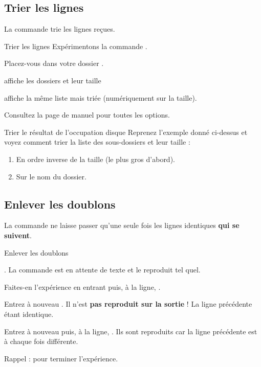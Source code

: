 \documentclass[a4paper,11pt]{style-esi/td}
\begin{document}
	\subsection{Trier les lignes}

		La commande  trie les lignes reçues.

		\begin{Experience}{Trier les lignes}
			Expérimentons la commande .
			\begin{steps}
			\item 
				Placez-vous dans votre dossier .
			\item 
				affiche les dossiers et leur taille
			\item 
				affiche la même liste mais triée (numériquement sur la taille).
			\end{steps}
			Consultez la page de manuel pour toutes les options.
		\end{Experience}

		\begin{Exercice}{Trier le résultat de l'occupation disque}
			Reprenez l'exemple donné ci-dessus et voyez comment trier
			la liste des sous-dossiers et leur taille :
			\begin{enumerate}
			\item En ordre inverse de la taille (le plus gros d'abord).
			\item Sur le nom du dossier.
			\end{enumerate}
		\end{Exercice}

	\subsection{Enlever les doublons}

		La commande  ne laisse passer qu'une seule fois
		les lignes identiques \textbf{qui se suivent}.

		\begin{Experience}{Enlever les doublons}
			\begin{steps}
			\item 
				\kbd{cat | uniq}.
				La commande est en attente de texte et le reproduit tel quel.
			\item 
				Faites-en l'expérience en entrant  puis, à la ligne,
				\kbd{hello}.
			\item 
				Entrez à nouveau \kbd{hello}.
				Il n'est \textbf{pas reproduit sur la sortie} !
				La ligne précédente étant identique.
			\item 
				Entrez à nouveau   puis, à la ligne, \kbd{hello}.
				Ils sont reproduits car la ligne précédente est à chaque fois
				différente.
			\item 
				Rappel :  pour terminer l'expérience.
			\end{steps}
		\end{Experience}
\end{document}
